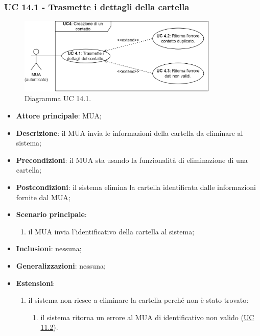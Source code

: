 \subsubsection{UC 14.1 - Trasmette i dettagli della cartella} \label{sec:UC14.1}
    \begin{figure}[h]
        \includegraphics[width=0.85\textwidth]{sections/uc_imgs/UC04.X.png}
        \centering
        \caption{Diagramma UC 14.1.}
    \end{figure}
    \begin{itemize}
        \item \textbf{Attore principale}: MUA;
        \item \textbf{Descrizione}: il MUA invia le informazioni della cartella da eliminare al sistema;
        \item \textbf{Precondizioni}: il MUA sta usando la funzionalità di eliminazione di una cartella;
        \item \textbf{Postcondizioni}: il sistema elimina la cartella identificata dalle informazioni fornite dal MUA;
        \item \textbf{Scenario principale}:
            \begin{enumerate}
                \item il MUA invia l'identificativo della cartella al sistema;
            \end{enumerate}
        \item \textbf{Inclusioni}: nessuna;
        \item \textbf{Generalizzazioni}: nessuna;
        \item \textbf{Estensioni}:
            \begin{enumerate}[label=\alph*.]
                \item il sistema non riesce a eliminare la cartella perché non è stato trovato:
                \begin{enumerate}[label=\arabic*.]
                    \item il sistema ritorna un errore al MUA di identificativo non valido (\hyperref[sec:UC11.2]{UC 11.2}).
                \end{enumerate}
            \end{enumerate}
    \end{itemize}


